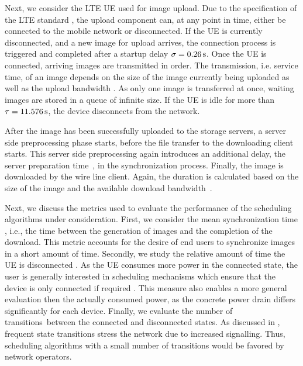 Next, we consider the \gls{LTE} \gls{UE} used for image upload.
Due to the specification of the \gls{LTE} standard \cite{3GPP_RRC_Spec}, the upload component can, at any point in time, either be connected to the mobile network or disconnected.
If the \gls{UE} is currently disconnected, and a new image for upload arrives, the connection process is triggered and completed after a startup delay \(\sigma = \SI{0.26}{\second}\).
Once the \gls{UE} is connected, arriving images are transmitted in order.
The transmission, i.e. service time, of an image depends on the size of the image currently being uploaded as well as the upload bandwidth \uploadbandwidth.
As only one image is transferred at once, waiting images are stored in a queue of infinite size.
If the \gls{UE} is idle for more than \(\tau = \SI{11.576}{\second}\), the device disconnects from the network.

After the image has been successfully uploaded to the storage servers, a server side preprocessing phase starts, before the file transfer to the downloading client starts.
This server side preprocessing again introduces an additional delay, the server preparation time~\serverpreparationtime, in the synchronization process.
Finally, the image is downloaded by the wire line client.
Again, the duration is calculated based on the size of the image and the available download bandwidth~\downloadbandwidth.

Next, we discuss the metrics used to evaluate the performance of the scheduling algorithms under consideration.
First, we consider the mean synchronization time \sojournTime, i.e., the time between the generation of images and the completion of the download.
This metric accounts for the desire of end users to synchronize images in a short amount of time.
Secondly, we study the relative amount of time the \gls{UE} is disconnected \relativeDisconnectedTime.
As the \gls{UE} consumes more power in the connected state, the user is generally interested in scheduling mechanisms which ensure that the device is only connected if required \cite{Ickin2012}.
This measure also enables a more general evaluation then the actually consumed power, as the concrete power drain differs significantly for each device.
Finally, we evaluate the number of transitions~\connectionCount between the connected and disconnected states.
As discussed in , frequent state transitions stress the network due to increased signalling.
Thus, scheduling algorithms with a small number of transitions would be favored by network operators.

